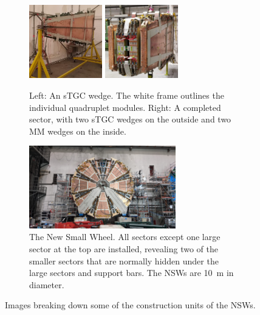 \begin{figure}
\begin{subfigure}{\textwidth}
  \centering
  \includegraphics[width=0.35\textwidth]{figures/stgc_wedge.jpg}
  \includegraphics[width=0.35\textwidth]{figures/sector.jpg}
  \caption{Left: An sTGC wedge. The white frame outlines the individual quadruplet modules. Right: A completed sector, with two sTGC wedges on the outside and two MM wedges on the inside.}
  \label{fig:wedge_and_sector}
\end{subfigure}

\smallskip

\begin{subfigure}{\textwidth}
  \centering
  \includegraphics[width=0.7\textwidth]{figures/nsw_2021-05-27_landscape.jpeg}
  \caption{The New Small Wheel. All sectors except one large sector at the top are installed, revealing two of the smaller sectors that are normally hidden under the large sectors and support bars. The NSWs are \SI{10}{m} in diameter. }
  \label{fig:nsw}
  \end{subfigure}
\caption{Images breaking down some of the construction units of the NSWs.}
\label{fig:nsw_breakdown}
\end{figure}
\newpage
\restoregeometry

